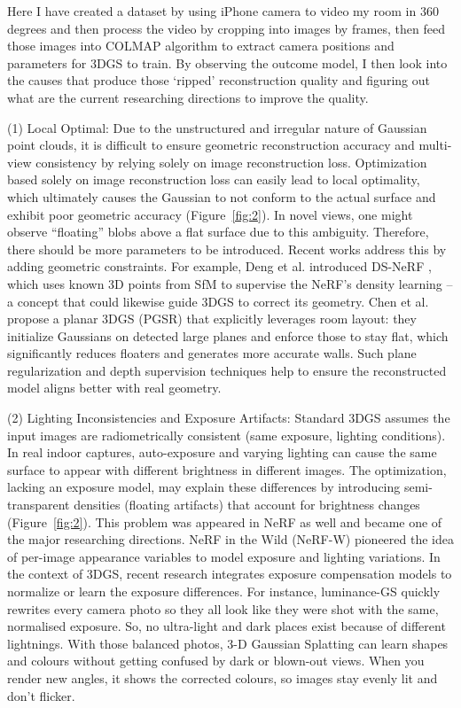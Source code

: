 \documentclass[11pt,a4paper]{article}
\begin{document}
Here I have created a dataset by using iPhone camera to video my room in 360 degrees and then process the video by cropping into images by frames, then feed those images into COLMAP algorithm to extract camera positions and parameters for 3DGS to train. By observing the outcome model, I then look into the causes that produce those `ripped' reconstruction quality and figuring out what are the current researching directions to improve the quality.

(1) Local Optimal: Due to the unstructured and irregular nature of Gaussian point clouds, it is difficult to ensure geometric reconstruction accuracy and multi-view consistency by relying solely on image reconstruction loss. Optimization based solely on image reconstruction loss can easily lead to local optimality, which ultimately causes the Gaussian to not conform to the actual surface and exhibit poor geometric accuracy (Figure~\ref{fig:2}). In novel views, one might observe ``floating'' blobs above a flat surface due to this ambiguity. Therefore, there should be more parameters to be introduced. Recent works address this by adding geometric constraints. For example, Deng et al. introduced DS-NeRF \cite{ref10}, which uses known 3D points from SfM to supervise the NeRF's density learning -- a concept that could likewise guide 3DGS to correct its geometry. Chen et al. propose a planar 3DGS (PGSR) \cite{ref11,ref28} that explicitly leverages room layout: they initialize Gaussians on detected large planes and enforce those to stay flat, which significantly reduces floaters and generates more accurate walls. Such plane regularization and depth supervision techniques help to ensure the reconstructed model aligns better with real geometry.

(2) Lighting Inconsistencies and Exposure Artifacts: Standard 3DGS assumes the input images are radiometrically consistent (same exposure, lighting conditions). In real indoor captures, auto-exposure and varying lighting can cause the same surface to appear with different brightness in different images. The optimization, lacking an exposure model, may explain these differences by introducing semi-transparent densities (floating artifacts) that account for brightness changes (Figure~\ref{fig:2}). This problem was appeared in NeRF as well and became one of the major researching directions. NeRF in the Wild (NeRF-W) \cite{ref12,ref22,ref23,ref24} pioneered the idea of per-image appearance variables to model exposure and lighting variations. In the context of 3DGS, recent research integrates exposure compensation models to normalize or learn the exposure differences. For instance, luminance-GS \cite{ref13} quickly rewrites every camera photo so they all look like they were shot with the same, normalised exposure. So, no ultra-light and dark places exist because of different lightnings. With those balanced photos, 3-D Gaussian Splatting can learn shapes and colours without getting confused by dark or blown-out views. When you render new angles, it shows the corrected colours, so images stay evenly lit and don't flicker.
\end{document}
